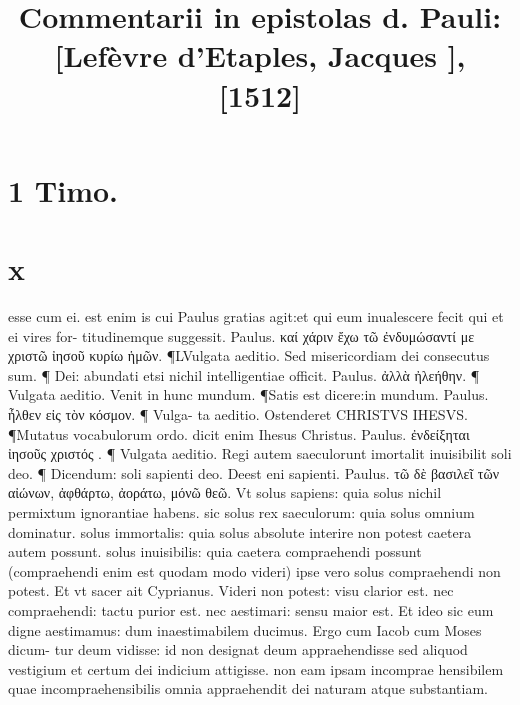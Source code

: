 \documentclass{article}
\begin{document}
\date{}
        \title{Commentarii in epistolas d. Pauli: [Lefèvre d'Etaples, Jacques ], [1512]}
\maketitle
\tableofcontents
\clearpage
\begin{pages} 
\beginnumbering
        
\section*{1 Timo. }
\section*{x }
\marginpar{[ p.203 ]}\pstart esse cum ei. est enim is cui Paulus gratias agit:et qui eum inualescere fecit qui et ei vires for- titudinemque  suggessit. Paulus. καί χάριν ἔχω τῶ ἐνδυμώσαντί με χριστῶ ἰησοῦ   κυρίω ἡμῶν. ¶LVulgata aeditio. Sed misericordiam dei consecutus sum. ¶ Dei: abundati   etsi nichil intelligentiae officit. Paulus. ἀλλὰ ἠλεήθην. ¶ Vulgata aeditio. Venit in   hunc mundum. ¶Satis est dicere:in mundum. Paulus. ἦλθεν εἰς τὸν κόσμον. ¶ Vulga-   ta aeditio. Ostenderet CHRISTVS IHESVS. ¶Mutatus vocabulorum ordo. dicit enim   Ihesus Christus. Paulus. ἐνδείξηται ἰησοῦς χριστός . ¶ Vulgata aeditio. Regi autem   saeculorunt imortalit inuisibilit soli deo. ¶ Dicendum: soli sapienti deo. Deest eni sapienti. Paulus.  τῶ δὲ βασιλεῖ τῶν αἰώνων, ἀφθάρτω, ἀοράτω, μόνῶ θεῶ. Vt solus sapiens: quia solus nichil permixtum ignorantiae habens. sic solus rex saeculorum: quia solus omnium dominatur. solus immortalis: quia solus absolute interire non potest caetera autem possunt. solus inuisibilis: quia caetera compraehendi possunt (compraehendi enim est quodam modo videri) ipse vero solus compraehendi non potest. Et vt sacer ait Cyprianus. Videri non potest: visu clarior est. nec compraehendi: tactu purior est. nec aestimari: sensu maior est. Et ideo sic eum digne aestimamus: dum inaestimabilem ducimus. Ergo cum Iacob cum Moses dicum- tur deum vidisse: id non designat deum appraehendisse sed aliquod vestigium et certum dei indicium attigisse. non eam ipsam incomprae hensibilem quae incompraehensibilis omnia appraehendit dei naturam atque  substantiam.  \pend

\end{pages}
\end{document}
